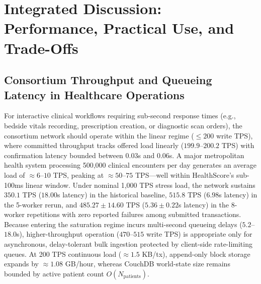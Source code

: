 \documentclass[runningheads]{llncs}
\begin{document}
\section{Integrated Discussion: Performance, Practical Use, and Trade-Offs}

\subsection{Consortium Throughput and Queueing Latency in Healthcare Operations}
For interactive clinical workflows requiring sub-second response times (e.g., bedside vitals recording, prescription creation, or diagnostic scan orders), the consortium network should operate within the linear regime ($\le 200$ write TPS), where committed throughput tracks offered load linearly ($199.9$--$200.2$ TPS) with confirmation latency bounded between $0.03$s and $0.06$s. A major metropolitan health system processing 500,000 clinical encounters per day generates an average load of $\approx 6$--$10$ TPS, peaking at $\approx 50$--$75$ TPS---well within HealthScore's sub-100ms linear window. Under nominal 1,000 TPS stress load, the network sustains $350.1$ TPS ($18.00$s latency) in the historical baseline, $515.8$ TPS ($6.98$s latency) in the 5-worker rerun, and $485.27 \pm 14.60$ TPS ($5.36 \pm 0.22$s latency) in the 8-worker repetitions with zero reported failures among submitted transactions. Because entering the saturation regime incurs multi-second queueing delays ($5.2$--$18.0$s), higher-throughput operation ($470$--$515$ write TPS) is appropriate only for asynchronous, delay-tolerant bulk ingestion protected by client-side rate-limiting queues. At 200 TPS continuous load ($\approx 1.5$ KB/tx), append-only block storage expands by $\approx 1.08$ GB/hour, whereas CouchDB world-state size remains bounded by active patient count $O(N_{\text{patients}})$.
\end{document}
